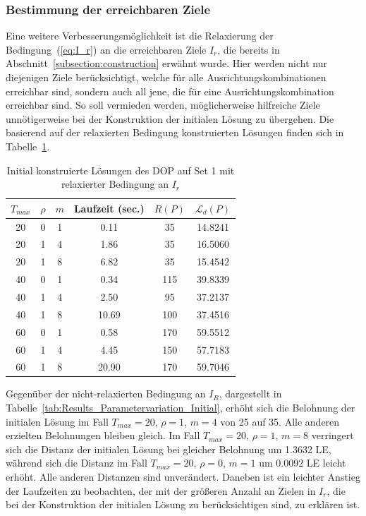 \documentclass[12pt,a4paper,twoside]{article}
\theoremstyle{definition}
\numberwithin{equation}{section}
\begin{document}
\subsubsection{Bestimmung der erreichbaren Ziele}\label{subsubsec:reachableLocations}
Eine weitere Verbesserungsmöglichkeit ist die Relaxierung der Bedingung~(\ref{eq:I_r}) an die erreichbaren Ziele $I_r$, die bereits in Abschnitt~\ref{subsection:construction} erwähnt wurde. Hier werden nicht nur diejenigen Ziele berücksichtigt, welche für alle Ausrichtungskombinationen erreichbar sind, sondern auch all jene, die für eine Ausrichtungskombination erreichbar sind. So soll vermieden werden, möglicherweise hilfreiche Ziele unnötigerweise bei der Konstruktion der initialen Lösung zu übergehen. Die basierend auf der relaxierten Bedingung konstruierten Lösungen finden sich in Tabelle~\ref{tab:Results_Parametervariation_Initial_notAllAngles}.

\begin{table}[h]
	\centering
	\begin{tabular}{ |c|c|c|c|c|c| }
		\hline
		$T_{max}$ & $\rho$ & $m$ &  Laufzeit (sec.) & $R(P)$ & $\mathcal{L}_d(P)$ \\
		\hline  
		20 & 0 & 1  & 0.11
		& 35 & 14.8241\\
		20 & 1 & 4  & 1.86
		& 35 & 16.5060 \\
		20 & 1 & 8  & 6.82
		& 35 & 15.4542\\ 
		40 & 0 & 1  & 0.34
		& 115 & 39.8339
		\\
		40 & 1 & 4 & 2.50
		& 95 & 37.2137
		\\
		40 & 1 & 8  & 10.69
		& 100 & 37.4516
		\\
		60 & 0 & 1  & 0.58
		& 170 & 59.5512
		\\
		60 & 1 & 4  & 4.45
		& 150 & 57.7183
		\\
		60 & 1 & 8  & 20.90
		& 170 & 59.7046
		\\
		\hline
	\end{tabular}
	\caption{Initial konstruierte Lösungen des DOP auf Set 1 mit relaxierter Bedingung an $I_r$}
	\label{tab:Results_Parametervariation_Initial_notAllAngles}
\end{table}

Gegenüber der nicht-relaxierten Bedingung an $I_R$, dargestellt in Tabelle~\ref{tab:Results_Parametervariation_Initial},
erhöht sich die Belohnung der initialen Lösung im Fall $T_{max} = 20$, $\rho = 1$, $m = 4$ von 25 auf 35. Alle anderen erzielten Belohnungen bleiben gleich. Im Fall $T_{max} = 20$, $\rho = 1$, $m = 8$ verringert sich die Distanz der initialen Lösung bei gleicher Belohnung um 1.3632 LE, während sich die Distanz im Fall $T_{max} = 20$, $\rho = 0$, $m = 1$ um 0.0092 LE leicht erhöht. Alle anderen Distanzen sind unverändert. Daneben ist ein leichter Anstieg der Laufzeiten zu beobachten, der mit der größeren Anzahl an Zielen in $I_r$, die bei der Konstruktion der initialen Lösung zu berücksichtigen sind, zu erklären ist.
\end{document}
